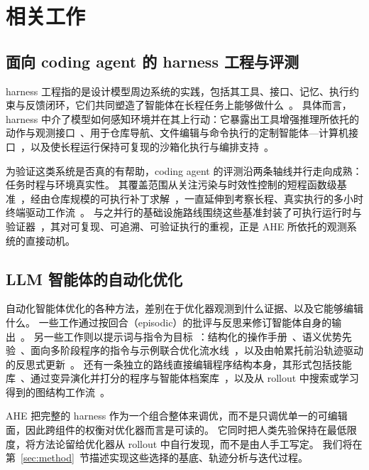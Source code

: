 \section{相关工作}
\label{sec:related}

\subsection{面向 coding agent 的 harness 工程与评测}
\label{ssec:related_harness}
harness 工程指的是设计模型周边系统的实践，包括其工具、接口、记忆、执行约束与反馈闭环，它们共同塑造了智能体在长程任务上能够做什么~\citep{rajasekaranHarnessDesignLongrunning2026,lopopoloHarnessEngineeringLeveraging2026,trivedyImprovingDeepAgents2026,anthropicClaudecode2025,steinbergerOpenClawPersonalAI2026,HermesAgentAgent}。
具体而言，harness 中介了模型如何感知环境并在其上行动：它暴露出工具增强推理所依托的动作与观测接口~\citep{anthropicClaudecode2025}、用于仓库导航、文件编辑与命令执行的定制智能体—计算机接口~\citep{yangSWEagentAgentComputerInterfaces2024}，以及使长程运行保持可复现的沙箱化执行与编排支持~\citep{wangOpenHandsOpenPlatform2025}。

为验证这类系统是否真的有帮助，coding agent 的评测沿两条轴线并行走向成熟：任务时程与环境真实性。
其覆盖范围从关注污染与时效性控制的短程函数级基准~\citep{zhuoBigCodeBenchBenchmarkingCode2024,jainLiveCodeBenchHolisticContamination2024}，经由仓库规模的可执行补丁求解~\citep{jimenezSWEbenchCanLanguage2023,yangSWEbenchMultimodalAI2024,dengSWEBenchProCan2025}，一直延伸到考察长程、真实执行的多小时终端驱动工作流~\citep{miserendinoSWELancerCanFrontier2025,chanMLEbenchEvaluatingMachine2024,merrillTerminalBenchBenchmarkingAgents2026a}。
与之并行的基础设施路线围绕这些基准封装了可执行运行时与验证器~\citep{panTrainingSoftwareEngineering2025,jainR2EGymProceduralEnvironment2025,zengSWEHubUnifiedProduction2026}，其对可复现、可追溯、可验证执行的重视，正是 AHE 所依托的观测系统的直接动机。


\subsection{LLM 智能体的自动化优化}
\label{ssec:related_auto}

自动化智能体优化的各种方法，差别在于优化器观测到什么证据、以及它能够编辑什么。
一些工作通过按回合（episodic）的批评与反思来修订智能体自身的输出~\citep{madaanSelfRefineIterativeRefinement2023c,shinnReflexionLanguageAgents2023c,guoCritiQMiningData2025}。
另一些工作则以提示词与指令为目标~\citep{khattabDSPyCompilingDeclarative2023}：结构化的操作手册~\citep{zhangAgenticContextEngineering2025a}、语义优势先验~\citep{caiTrainingFreeGroupRelative2025}、面向多阶段程序的指令与示例联合优化流水线~\citep{opsahl-ongOptimizingInstructionsDemonstrations2024a}，以及由帕累托前沿轨迹驱动的反思式更新~\citep{agrawalGEPAReflectivePrompt2025a}。
还有一条独立的路线直接编辑程序结构本身，其形式包括技能库~\citep{wangVoyagerOpenEndedEmbodied2023a}、通过变异演化并打分的程序与智能体档案库~\citep{novikovAlphaEvolveCodingAgent2025a,huAutomatedDesignAgentic2024}，以及从 rollout 中搜索或学习得到的图结构工作流~\citep{zhangAFlowAutomatingAgentic2024,zhouSymbolicLearningEnables2024a}。

AHE 把完整的 harness 作为一个组合整体来调优，而不是只调优单一的可编辑面，因此跨组件的权衡对优化器而言是可读的。
它同时把人类先验保持在最低限度，将方法论留给优化器从 rollout 中自行发现，而不是由人手工写定。
我们将在第~\ref{sec:method}~节描述实现这些选择的基底、轨迹分析与迭代过程。
